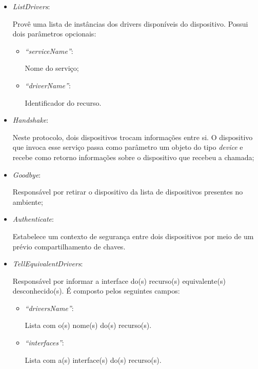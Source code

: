 \begin{itemize}
	\item \emph{ListDrivers}: 

		Provê uma lista de instâncias dos drivers disponíveis do dispositivo. Possui dois parâmetros opcionais:
		\begin{itemize}
			\item \emph{``serviceName''}: 

				Nome do serviço;
			\item \emph{``driverName''}: 

				Identificador do recurso.
		\end{itemize}
	\item \emph{Handshake}: 

		Neste protocolo, dois dispositivos trocam informações entre si. O dispositivo que invoca esse serviço passa como parâmetro um objeto do tipo \emph{device} e recebe como retorno informações sobre o dispositivo que recebeu a chamada;
	\item \emph{Goodbye}: 

		Responsável por retirar o dispositivo da lista de dispositivos presentes no ambiente;
	\item \emph{Authenticate}: 

		Estabelece um contexto de segurança entre dois dispositivos por meio de um prévio compartilhamento de chaves.
	\item \emph{TellEquivalentDrivers}:

		Responsável por informar a interface do(s) recurso(s) equivalente(s) desconhecido(s). É composto pelos seguintes campos:
		\begin{itemize}
			\item \emph{``driversName''}:

			Lista com o(s) nome(s) do(s) recurso(s).

			\item \emph{``interfaces''}:

			Lista com a(s) interface(s) do(s) recurso(s).
		\end{itemize}
\end{itemize}


\begin{comment}
Serão afetados, ainda, dois protocolos básicos, o \emph{Service Call} e o \emph{Notify}, e o serviço \emph{ListDrivers} dos protocolos \emph{Device Driver} e \emph{Register Driver}. Todos esses serviços contém o parâmetro \emph{driver} que passará a representar uma classe dentre as classes de recursos e não mais o nome do recurso simplesmente.
\end{comment}

